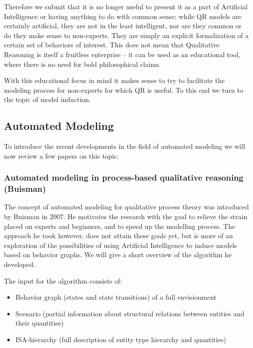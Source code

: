 \documentclass{article} %
\begin{document}
Therefore we submit that it is no longer useful to present it as a part of
Artificial Intelligence or having anything to do with common sense; while QR
models are certainly artificial, they are not in the least intelligent, nor are
they common or do they make sense to non-experts.  They are simply an explicit
formalization of a certain set of behaviors of interest. This does not mean
that Qualitative Reasoning is itself a fruitless enterprise -- it can be used
as an educational tool, where there is no need for bold philosophical claims.

With this educational focus in mind it makes sense to try to facilitate the
modeling process for non-experts for which QR is useful. To this end we turn
to the topic of model induction.

\subsection{Automated Modeling} %

To introduce the recent developments in the field of automated modeling we
will now review a few papers on this topic.

\subsubsection{Automated modeling in process-based qualitative reasoning
(Buisman)}

The concept of automated modeling for qualitative process theory was
introduced by Buisman \cite{buisman} in 2007. He motivates the research with
the goal to relieve the strain placed on experts and beginners, and to speed
up the modelling process. The approach he took however, does not attain these
goals yet, but is more of an exploration of the possibilities of using
Artificial Intelligence to induce models based on behavior graphs. We will
give a short overview of the algorithm he developed.

The input for the algorithm consists of:

\begin{itemize}

\item Behavior graph (states and state transitions) of a full envisionment

\item Scenario (partial information about structural relations between entities and their quantities)

\item ISA-hierarchy (full description of entity type hierarchy and quantities)

\end{itemize}
\end{document}
